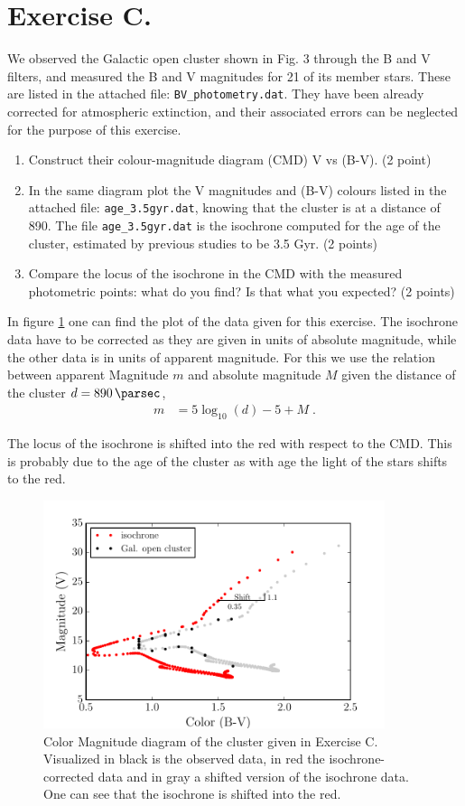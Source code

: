 \documentclass[11pt,a4paper,twoside]{article}
\newcommand{\op}[1]{\operatorname{#1}}
\begin{document}
\section*{Exercise C.} 
We observed the Galactic open cluster shown in Fig. 3 through the B and V
filters, and measured the B and V magnitudes for 21 of its member stars. These 
are listed in the attached file: \verb+BV_photometry.dat+. They have been 
already corrected for atmospheric extinction, and their associated errors can 
be neglected for the purpose of this exercise.

\begin{enumerate}
\item Construct their colour-magnitude diagram (CMD) V vs (B-V). (2 point)
\item In the same diagram plot the V magnitudes and (B-V) colours listed in the 
attached file: \verb+age_3.5gyr.dat+, knowing that the cluster is at a distance
of \SI{890}{\parsec}. The file \verb+age_3.5gyr.dat+ is the isochrone computed for 
the age of the cluster, estimated by previous studies to be 3.5 Gyr. (2 points)
\item Compare the locus of the isochrone in the CMD with the measured 
photometric points: what do you find? Is that what you expected? (2 points)
\end{enumerate}

In figure \ref{fig:cmd} one can find the plot of the data given for this 
exercise. 
The isochrone data have to be corrected as they are given in units of absolute
magnitude, while the other data is in units of apparent magnitude. For this
we use the relation between apparent Magnitude $m$ and absolute magnitude $M$
given the distance of the cluster $d = \SI{890}{\parsec}$,
\begin{align}
    m &= 5\op{log}_{10}(d) - 5 + M \;.
\end{align}

The locus of the isochrone is shifted into the red with respect to the CMD. 
This is probably due to the age of the cluster as with age the light of the 
stars shifts to the red.


\begin{figure}
\centering
\includegraphics[width=10cm]{pic/CMD}
\caption{Color Magnitude diagram of the cluster given in Exercise C. 
         Visualized in black is the observed data, in red the 
         isochrone-corrected data and in gray a shifted version of the 
         isochrone data. One can see that the isochrone is shifted into the 
         red.}
\label{fig:cmd}
\end{figure}
\end{document}
